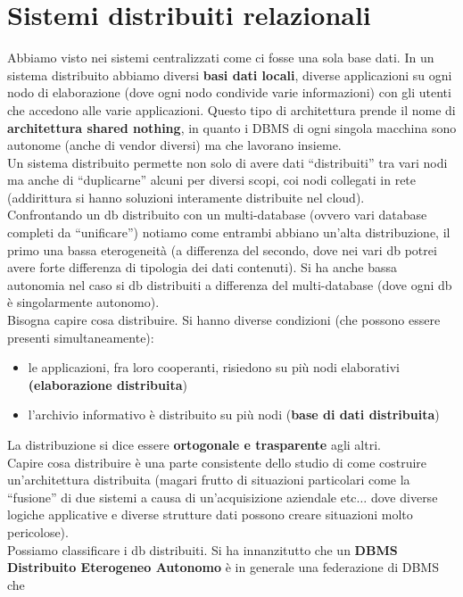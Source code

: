 \documentclass[a4paper,12pt, oneside]{book}
\begin{document}
\chapter{Sistemi distribuiti relazionali}
Abbiamo visto nei sistemi centralizzati come ci fosse una sola base dati. In un
sistema distribuito abbiamo diversi \textbf{basi dati locali}, diverse
applicazioni su ogni nodo di elaborazione (dove ogni nodo condivide varie
informazioni) con gli utenti che accedono alle varie applicazioni. Questo tipo
di architettura prende il nome di \textbf{architettura shared nothing}, in
quanto i DBMS di ogni singola macchina sono autonome (anche di vendor diversi)
ma che lavorano insieme.\\
Un sistema distribuito permette non solo di avere dati ``distribuiti'' tra vari
nodi ma anche di ``duplicarne'' alcuni per diversi scopi, coi nodi collegati in
rete (addirittura si hanno soluzioni interamente distribuite nel cloud).\\
Confrontando un db distribuito con un multi-database (ovvero vari database
completi da ``unificare'') notiamo come entrambi
abbiano un'alta distribuzione, il primo una bassa eterogeneità (a differenza del
secondo, dove nei vari db potrei avere forte differenza di tipologia dei dati
contenuti). Si ha anche bassa autonomia nel caso si db distribuiti a differenza
del multi-database (dove ogni db è singolarmente autonomo).\\
Bisogna capire cosa distribuire. Si hanno diverse condizioni (che possono essere
presenti simultaneamente):
\begin{itemize}
  \item le applicazioni, fra loro cooperanti, risiedono su più nodi elaborativi
  \textbf{(elaborazione distribuita})
  \item l'archivio informativo è distribuito su più nodi (\textbf{base di dati
  distribuita}) 
\end{itemize}
La distribuzione si dice essere \textbf{ortogonale e trasparente} agli altri.\\
Capire cosa distribuire è una parte consistente dello studio di come costruire
un'architettura distribuita (magari frutto di situazioni particolari come la
``fusione'' di due sistemi a causa di un'acquisizione aziendale etc$\ldots$ dove
diverse logiche applicative e diverse strutture dati possono creare situazioni
molto pericolose).\\
Possiamo classificare i db distribuiti. Si ha innanzitutto che un \textbf{DBMS
Distribuito Eterogeneo Autonomo} è in generale una federazione di DBMS che
\end{document}
